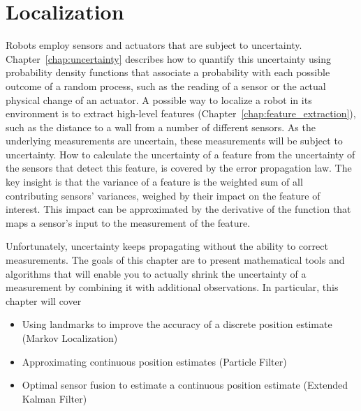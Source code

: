 \chapter{Localization}\label{chap:localization}
Robots employ sensors and actuators that are subject to uncertainty. Chapter~\ref{chap:uncertainty} describes how to quantify this uncertainty using probability density functions that associate a probability with each possible outcome of a random process, such as the reading of a sensor or the actual physical change of an actuator.
A possible way to localize a robot in its environment is to extract high-level features (Chapter~\ref{chap:feature_extraction}), such as the distance to a wall from a number of different sensors. As the underlying measurements are uncertain, these measurements will be subject to uncertainty. How to calculate the uncertainty of a feature from the uncertainty of the sensors that detect this feature, is covered by the error propagation law. The key insight is that the variance of a feature is the weighted sum of all contributing sensors' variances, weighed by their impact on the feature of interest. This impact can be approximated by the derivative of the function that maps a sensor's input to the measurement of the feature.

 Unfortunately, uncertainty keeps propagating without the ability to correct measurements. The goals of this chapter are to present mathematical tools and algorithms that will enable you to actually shrink the uncertainty of a measurement by combining it with additional observations.  In particular, this chapter will cover
\begin{itemize}
\item Using landmarks to improve the accuracy of a discrete position estimate (Markov Localization)
\item Approximating continuous position estimates (Particle Filter)
\item Optimal sensor fusion to estimate a continuous position estimate (Extended Kalman Filter)
\end{itemize}

